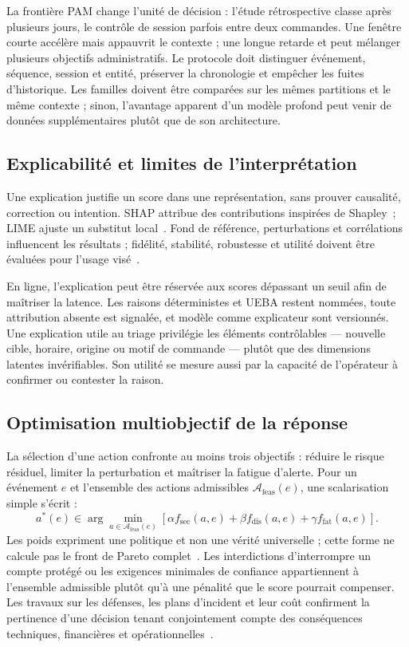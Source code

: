 \documentclass[11pt,a4paper,oneside]{report}
\theoremstyle{definition}
\theoremstyle{plain}
\begin{document}
La frontière PAM change l'unité de décision : l'étude rétrospective classe après plusieurs jours, le contrôle de session parfois entre deux commandes. Une fenêtre courte accélère mais appauvrit le contexte ; une longue retarde et peut mélanger plusieurs objectifs administratifs. Le protocole doit distinguer événement, séquence, session et entité, préserver la chronologie et empêcher les fuites d'historique. Les familles doivent être comparées sur les mêmes partitions et le même contexte ; sinon, l'avantage apparent d'un modèle profond peut venir de données supplémentaires plutôt que de son architecture.

\subsection{Explicabilité et limites de l'interprétation}

Une explication justifie un score dans une représentation, sans prouver causalité, correction ou intention. SHAP attribue des contributions inspirées de Shapley~\cite{ref12}; LIME ajuste un substitut local~\cite{ref13}. Fond de référence, perturbations et corrélations influencent les résultats ; fidélité, stabilité, robustesse et utilité doivent être évaluées pour l'usage visé~\cite{ref25}.

En ligne, l'explication peut être réservée aux scores dépassant un seuil afin de maîtriser la latence. Les raisons déterministes et UEBA restent nommées, toute attribution absente est signalée, et modèle comme explicateur sont versionnés. Une explication utile au triage privilégie les éléments contrôlables --- nouvelle cible, horaire, origine ou motif de commande --- plutôt que des dimensions latentes invérifiables. Son utilité se mesure aussi par la capacité de l'opérateur à confirmer ou contester la raison.

\subsection{Optimisation multiobjectif de la réponse}

La sélection d'une action confronte au moins trois objectifs : réduire le risque résiduel, limiter la perturbation et maîtriser la fatigue d'alerte. Pour un événement $e$ et l'ensemble des actions admissibles $\mathcal{A}_{\mathrm{feas}}(e)$, une scalarisation simple s'écrit :
\begin{equation}
 a^*(e)\in\arg\min_{a\in\mathcal{A}_{\mathrm{feas}}(e)}
 \left[\alpha f_{\mathrm{sec}}(a,e)+\beta f_{\mathrm{dis}}(a,e)+\gamma f_{\mathrm{fat}}(a,e)\right].
\end{equation}
Les poids expriment une politique et non une vérité universelle ; cette forme ne calcule pas le front de Pareto complet~\cite{ref39}. Les interdictions d'interrompre un compte protégé ou les exigences minimales de confiance appartiennent à l'ensemble admissible plutôt qu'à une pénalité que le score pourrait compenser. Les travaux sur les défenses, les plans d'incident et leur coût confirment la pertinence d'une décision tenant conjointement compte des conséquences techniques, financières et opérationnelles~\cite{ref33,ref38}.
\end{document}
